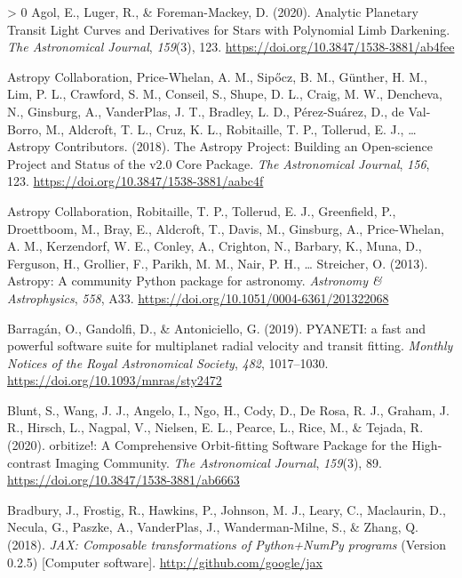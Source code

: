 \documentclass[10pt,a4paper,onecolumn]{article}
\newlength{\cslhangindent}
\newenvironment{CSLReferences}[3] %
 {%
  \setlength{\parindent}{0pt}
  \ifodd #1 \everypar{\setlength{\hangindent}{\cslhangindent}}\ignorespaces\fi
  \ifnum #2 > 0
  \setlength{\parskip}{#2\baselineskip}
  \fi
 }%
 {}
\begin{document}
\hypertarget{refs}{}
\begin{CSLReferences}{1}{0}
\leavevmode\hypertarget{ref-agol20}{}%
Agol, E., Luger, R., \& Foreman-Mackey, D. (2020). {Analytic Planetary
Transit Light Curves and Derivatives for Stars with Polynomial Limb
Darkening}. \emph{The Astronomical Journal}, \emph{159}(3), 123.
\url{https://doi.org/10.3847/1538-3881/ab4fee}

\leavevmode\hypertarget{ref-astropy18}{}%
Astropy Collaboration, Price-Whelan, A. M., Sipőcz, B. M., Günther, H.
M., Lim, P. L., Crawford, S. M., Conseil, S., Shupe, D. L., Craig, M.
W., Dencheva, N., Ginsburg, A., VanderPlas, J. T., Bradley, L. D.,
Pérez-Suárez, D., de Val-Borro, M., Aldcroft, T. L., Cruz, K. L.,
Robitaille, T. P., Tollerud, E. J., \ldots{} Astropy Contributors.
(2018). {The Astropy Project: Building an Open-science Project and
Status of the v2.0 Core Package}. \emph{The Astronomical Journal},
\emph{156}, 123. \url{https://doi.org/10.3847/1538-3881/aabc4f}

\leavevmode\hypertarget{ref-astropy13}{}%
Astropy Collaboration, Robitaille, T. P., Tollerud, E. J., Greenfield,
P., Droettboom, M., Bray, E., Aldcroft, T., Davis, M., Ginsburg, A.,
Price-Whelan, A. M., Kerzendorf, W. E., Conley, A., Crighton, N.,
Barbary, K., Muna, D., Ferguson, H., Grollier, F., Parikh, M. M., Nair,
P. H., \ldots{} Streicher, O. (2013). {Astropy: A community Python
package for astronomy}. \emph{Astronomy \& Astrophysics}, \emph{558},
A33. \url{https://doi.org/10.1051/0004-6361/201322068}

\leavevmode\hypertarget{ref-barragan19}{}%
Barragán, O., Gandolfi, D., \& Antoniciello, G. (2019). {PYANETI: a fast
and powerful software suite for multiplanet radial velocity and transit
fitting}. \emph{Monthly Notices of the Royal Astronomical Society},
\emph{482}, 1017--1030. \url{https://doi.org/10.1093/mnras/sty2472}

\leavevmode\hypertarget{ref-blunt20}{}%
Blunt, S., Wang, J. J., Angelo, I., Ngo, H., Cody, D., De Rosa, R. J.,
Graham, J. R., Hirsch, L., Nagpal, V., Nielsen, E. L., Pearce, L., Rice,
M., \& Tejada, R. (2020). {orbitize!: A Comprehensive Orbit-fitting
Software Package for the High-contrast Imaging Community}. \emph{The
Astronomical Journal}, \emph{159}(3), 89.
\url{https://doi.org/10.3847/1538-3881/ab6663}

\leavevmode\hypertarget{ref-jax}{}%
Bradbury, J., Frostig, R., Hawkins, P., Johnson, M. J., Leary, C.,
Maclaurin, D., Necula, G., Paszke, A., VanderPlas, J., Wanderman-Milne,
S., \& Zhang, Q. (2018). \emph{{JAX}: Composable transformations of
{P}ython+{N}um{P}y programs} (Version 0.2.5) {[}Computer software{]}.
\url{http://github.com/google/jax}


\end{CSLReferences}
\end{document}
